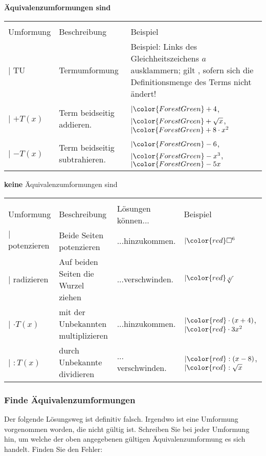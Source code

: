 \textbf{Äquivalenzumformungen sind}

\begin{tabular}{lp{6cm}p{8cm}}\hline\\%
Umformung   & Beschreibung  & Beispiel \\\hline
$| $ TU      & Termumformung & {\raggedright Beispiel: Links des Gleichheitszeichens $a$ ausklammern; gilt , sofern sich die Definitionsmenge des Terms nicht ändert!}\\
$| $ $+ T(x)$  & Term beidseitig addieren. & $| \color{ForestGreen}+4$, $| \color{ForestGreen}+\sqrt{x}$, $| \color{ForestGreen}+8\cdot{}x^2$\\
$| $ $- T(x)$  & Term beidseitig subtrahieren. & $| \color{ForestGreen}-6$, $|\color{ForestGreen}-x^3$, $|\color{ForestGreen} -5x$\\
\end{tabular}

\textbf{keine} Äquivalenzumformungen sind

\begin{tabular}{lp{6cm}>{\raggedright}p{4cm}p{4cm}}\hline\\
Umformung  & Beschreibung &Lösungen können... & Beispiel\\\hline
$| $ potenzieren  & Beide Seiten potenzieren & ...hinzukommen.&$| \color{red}\Box{}^6$\\
$| $ radizieren & Auf beiden Seiten die Wurzel ziehen& ...verschwinden.&$| \color{red}\sqrt[4]{\,}$\\
$| $ $\cdot{}T(x)$  & mit der Unbekannten multiplizieren & ...hinzukommen.&$| \color{red}\cdot{}(x+4)$, $| \color{red}\cdot{}3x^2$\\
$| $ $:T(x)$  & durch Unbekannte dividieren & ... verschwinden.&$|
\color{red}:(x-8)$, $| \color{red}:\sqrt{x}$\\

\end{tabular}
\newpage

\subsubsection{Finde Äquivalenzumformungen}
Der folgende Lösungsweg ist definitiv falsch. Irgendwo ist eine Umformung vorgenommen worden, die nicht gültig ist.
Schreiben Sie bei jeder Umformung hin, um welche der oben angegebenen gültigen Äquivalenzumformung es sich handelt. Finden Sie den Fehler:

